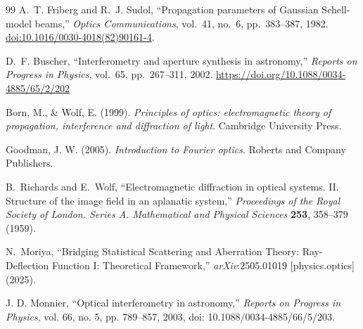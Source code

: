 \documentclass[a4paper,12pt]{article}
\begin{document}
\begin{thebibliography}{99}
A.~T. Friberg and R.~J. Sudol,
``Propagation parameters of Gaussian Schell-model beams,''
\textit{Optics Communications}, vol.~41, no.~6, pp.~383--387, 1982.
\href{https://doi.org/10.1016/0030-4018(82)90161-4}{doi:10.1016/0030-4018(82)90161-4}.

D.~F. Buscher, ``Interferometry and aperture synthesis in astronomy,'' \emph{Reports on Progress in Physics}, vol.~65, pp.~267--311, 2002. \url{https://doi.org/10.1088/0034-4885/65/2/202}

Born, M., \& Wolf, E. (1999). 
\textit{Principles of optics: electromagnetic theory of propagation, interference and diffraction of light}. 
Cambridge University Press.

Goodman, J. W. (2005). 
\textit{Introduction to Fourier optics}. 
Roberts and Company Publishers.

B.~Richards and E.~Wolf, ``Electromagnetic diffraction in optical systems. II. Structure of the image field in an aplanatic system,'' \textit{Proceedings of the Royal Society of London. Series A. Mathematical and Physical Sciences} \textbf{253}, 358--379 (1959).

N.~Moriya, ``Bridging Statistical Scattering and Aberration Theory:
Ray-Deflection Function I: Theoretical Framework,''
\emph{arXiv}:2505.01019 [physics.optics] (2025).

J. D. Monnier, ``Optical interferometry in astronomy,'' \emph{Reports on Progress in Physics}, vol. 66, no. 5, pp. 789--857, 2003, doi: 10.1088/0034-4885/66/5/203.

\end{thebibliography}
\end{document}

